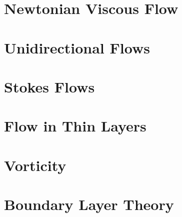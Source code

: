 \documentclass[british,11pt,a4paper]{report}
\begin{document}
\maketitle
\tableofcontents

\chapter{Newtonian Viscous Flow}

\chapter{Unidirectional Flows}

\chapter{Stokes Flows}

\chapter{Flow in Thin Layers}

\chapter{Vorticity}

\chapter{Boundary Layer Theory}

\end{document}

